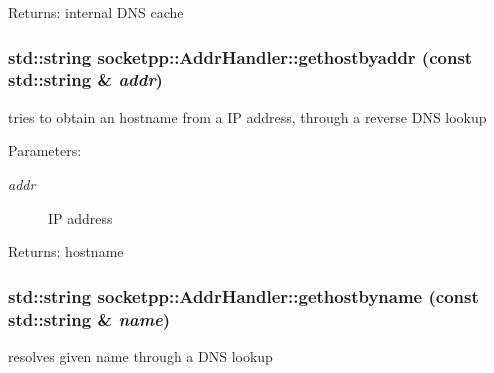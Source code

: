 \begin{Desc}
\item[Returns:]internal DNS cache \end{Desc}
\hypertarget{classsocketpp_1_1AddrHandler_2e9b9e6dc7ea4fc4a3500665b3f4062d}{
\subsubsection[{gethostbyaddr}]{\setlength{\rightskip}{0pt plus 5cm}std::string socketpp::AddrHandler::gethostbyaddr (const std::string \& {\em addr})}}
\label{classsocketpp_1_1AddrHandler_2e9b9e6dc7ea4fc4a3500665b3f4062d}


tries to obtain an hostname from a IP address, through a reverse DNS lookup 

\begin{Desc}
\item[Parameters:]
\begin{description}
\item[{\em addr}]IP address \end{description}
\end{Desc}
\begin{Desc}
\item[Returns:]hostname \end{Desc}
\hypertarget{classsocketpp_1_1AddrHandler_19aebc1e9779dee4e5f06d7b39e18959}{
\subsubsection[{gethostbyname}]{\setlength{\rightskip}{0pt plus 5cm}std::string socketpp::AddrHandler::gethostbyname (const std::string \& {\em name})}}
\label{classsocketpp_1_1AddrHandler_19aebc1e9779dee4e5f06d7b39e18959}


resolves given name through a DNS lookup 

